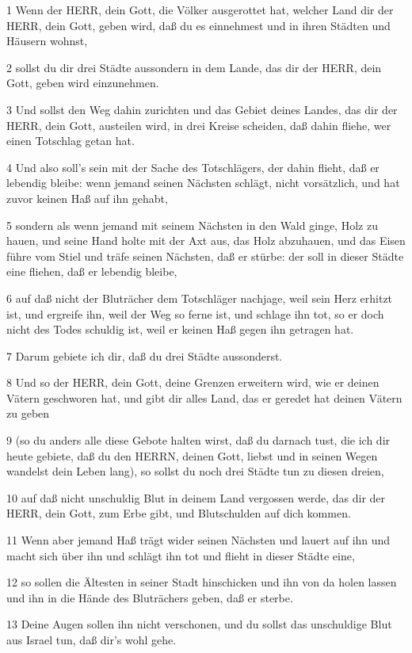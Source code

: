 \par 1 Wenn der HERR, dein Gott, die Völker ausgerottet hat, welcher Land dir der HERR, dein Gott, geben wird, daß du es einnehmest und in ihren Städten und Häusern wohnst,
\par 2 sollst du dir drei Städte aussondern in dem Lande, das dir der HERR, dein Gott, geben wird einzunehmen.
\par 3 Und sollst den Weg dahin zurichten und das Gebiet deines Landes, das dir der HERR, dein Gott, austeilen wird, in drei Kreise scheiden, daß dahin fliehe, wer einen Totschlag getan hat.
\par 4 Und also soll's sein mit der Sache des Totschlägers, der dahin flieht, daß er lebendig bleibe: wenn jemand seinen Nächsten schlägt, nicht vorsätzlich, und hat zuvor keinen Haß auf ihn gehabt,
\par 5 sondern als wenn jemand mit seinem Nächsten in den Wald ginge, Holz zu hauen, und seine Hand holte mit der Axt aus, das Holz abzuhauen, und das Eisen führe vom Stiel und träfe seinen Nächsten, daß er stürbe: der soll in dieser Städte eine fliehen, daß er lebendig bleibe,
\par 6 auf daß nicht der Bluträcher dem Totschläger nachjage, weil sein Herz erhitzt ist, und ergreife ihn, weil der Weg so ferne ist, und schlage ihn tot, so er doch nicht des Todes schuldig ist, weil er keinen Haß gegen ihn getragen hat.
\par 7 Darum gebiete ich dir, daß du drei Städte aussonderst.
\par 8 Und so der HERR, dein Gott, deine Grenzen erweitern wird, wie er deinen Vätern geschworen hat, und gibt dir alles Land, das er geredet hat deinen Vätern zu geben
\par 9 (so du anders alle diese Gebote halten wirst, daß du darnach tust, die ich dir heute gebiete, daß du den HERRN, deinen Gott, liebst und in seinen Wegen wandelst dein Leben lang), so sollst du noch drei Städte tun zu diesen dreien,
\par 10 auf daß nicht unschuldig Blut in deinem Land vergossen werde, das dir der HERR, dein Gott, zum Erbe gibt, und Blutschulden auf dich kommen.
\par 11 Wenn aber jemand Haß trägt wider seinen Nächsten und lauert auf ihn und macht sich über ihn und schlägt ihn tot und flieht in dieser Städte eine,
\par 12 so sollen die Ältesten in seiner Stadt hinschicken und ihn von da holen lassen und ihn in die Hände des Bluträchers geben, daß er sterbe.
\par 13 Deine Augen sollen ihn nicht verschonen, und du sollst das unschuldige Blut aus Israel tun, daß dir's wohl gehe.
